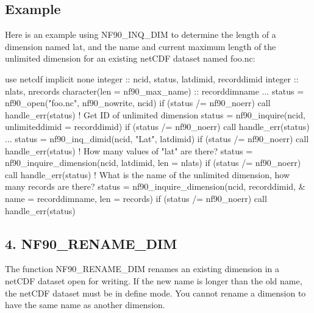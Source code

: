 \subsection*{Example}

Here is an example using N\+F90\+\_\+\+I\+N\+Q\+\_\+\+D\+IM to determine the length of a dimension named lat, and the name and current maximum length of the unlimited dimension for an existing net\+C\+DF dataset named foo.\+nc\+:


\begin{DoxyCode}
\textcolor{keywordtype}{use }netcdf
\textcolor{keywordtype}{implicit none}
\textcolor{keywordtype}{integer} :: ncid, status, latdimid, recorddimid
\textcolor{keywordtype}{integer} :: nlats, nrecords
\textcolor{keywordtype}{character(len = nf90\_max\_name)} :: recorddimname
...
status = nf90\_open(\textcolor{stringliteral}{"foo.nc"}, nf90\_nowrite, ncid)
\textcolor{keywordflow}{if} (status /= nf90\_noerr) \textcolor{keyword}{call }handle\_err(status)
\textcolor{comment}{! Get ID of unlimited dimension}
status = nf90\_inquire(ncid, unlimiteddimid = recorddimid)
\textcolor{keywordflow}{if} (status /= nf90\_noerr) \textcolor{keyword}{call }handle\_err(status)
...
status = nf90\_inq\_dimid(ncid, \textcolor{stringliteral}{"Lat"}, latdimid)
\textcolor{keywordflow}{if} (status /= nf90\_noerr) \textcolor{keyword}{call }handle\_err(status)
\textcolor{comment}{! How many values of "lat" are there?}
status = nf90\_inquire\_dimension(ncid, latdimid, len = nlats)
\textcolor{keywordflow}{if} (status /= nf90\_noerr) \textcolor{keyword}{call }handle\_err(status)
\textcolor{comment}{! What is the name of the unlimited dimension, how many records are there?}
status = nf90\_inquire\_dimension(ncid, recorddimid, &
                                name = recorddimname, len = records)
\textcolor{keywordflow}{if} (status /= nf90\_noerr) \textcolor{keyword}{call }handle\_err(status)
\end{DoxyCode}
\hypertarget{f90_dimensions_f90-nf90_rename_dim}{}\subsection{4. N\+F90\+\_\+\+R\+E\+N\+A\+M\+E\+\_\+\+D\+I\+M }\label{f90_dimensions_f90-nf90_rename_dim}
The function N\+F90\+\_\+\+R\+E\+N\+A\+M\+E\+\_\+\+D\+IM renames an existing dimension in a net\+C\+DF dataset open for writing. If the new name is longer than the old name, the net\+C\+DF dataset must be in define mode. You cannot rename a dimension to have the same name as another dimension.

